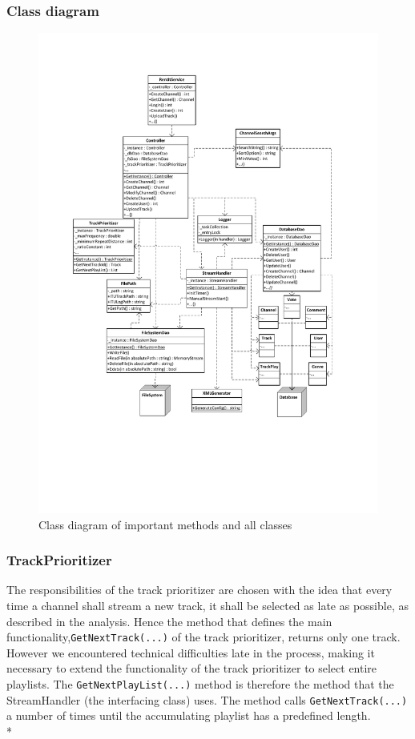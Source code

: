 \documentclass[a4paper,11pt,report]{article}
\begin{document}
\subsubsection{Class diagram}
\begin{figure}[H]
  \centering
\includegraphics[width=400pt,keepaspectratio=true,trim=80pt 170pt 80pt 50pt]{./ClassDiagramv2.pdf}
\caption{Class diagram of important methods and all classes}
\end{figure}

\subsubsection{TrackPrioritizer} \label{sec:tp}
The responsibilities of the track prioritizer are chosen with the idea that every time a channel shall stream a new track, it shall be selected as late as possible, as described in the analysis. Hence the method that defines the main functionality,\texttt{GetNextTrack(...)} of the track prioritizer, returns only one track. However we encountered technical difficulties late in the process, making it necessary to extend the functionality of the track prioritizer to select entire playlists. The \texttt{GetNextPlayList(...)} method is therefore the method that the StreamHandler (the interfacing class) uses. The method calls \texttt{GetNextTrack(...)} a number of times until the accumulating playlist has a predefined length. \\*
\end{document}
